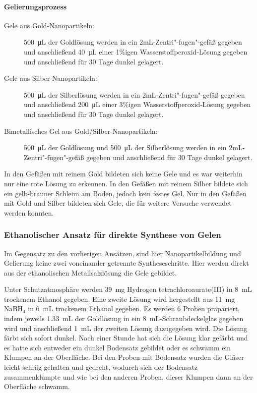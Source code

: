 			\paragraph{Gelierungsprozess}
			    \begin{description}
			    \item[Gele aus Gold-Nanopartikeln:]
			    \SI{500}{\micro\liter} der Goldlösung werden in ein 2mL-Zentri"-fugen"-gefäß gegeben und anschließend \SI{40}{\micro\liter} einer 1\%igen Wasserstoffperoxid-Lösung gegeben und anschließend für 30 Tage dunkel gelagert.
			    \item[Gele aus Silber-Nanopartikeln:]
			    \SI{500}{\micro\liter} der Silberlösung werden in ein 2mL-Zentri"-fugen"-gefäß gegeben und anschließend \SI{200}{\micro\liter} einer 3\%igen Wasserstoffperoxid-Lösung gegeben und anschließend für 30 Tage dunkel gelagert.
			    \item[Bimetallisches Gel aus Gold/Silber-Nanopartikeln:]
			    \SI{500}{\micro\liter} der Goldlösung und 	\SI{500}{\micro\liter} der Silberlösung werden in ein 2mL-Zentri"-fugen"-gefäß gegeben und anschließend für 30 Tage dunkel gelagert.
			    \end{description}
			   	
			   	In den Gefäßen mit reinem Gold bildeten sich keine Gele und es war weiterhin nur eine rote Lösung zu erkennen.
			   	In den Gefäßen mit reinem Silber bildete sich ein gelb-brauner Schleim am Boden, jedoch kein festes Gel.
			   	Nur in den Gefäßen mit Gold und Silber bildeten sich Gele, die für weitere Versuche verwendet werden konnten.
			
		\subsubsection{Ethanolischer Ansatz für direkte Synthese von Gelen}
			Im Gegensatz zu den vorherigen Ansätzen, sind hier Nanopartikelbildung und Gelierung keine zwei voneinander getrennte Syntheseschritte.
			Hier werden direkt aus der ethanolischen Metallsalzlösung die Gele gebildet. \autocite{Georgi2019}
			
			Unter Schutzatmosphäre werden \SI{39}{\milli\gram} Hydrogen tetrachloroaurate(III) in \SI{8}{\milli\liter} trockenem Ethanol gegeben.
			Eine zweite Lösung wird hergestellt aus \SI{11}{\milli\gram} NaBH$_4$ in \SI{6}{\milli\liter} trockenem Ethanol gegeben.
			Es werden 6 Proben präpariert, indem jeweils \SI{1,33}{\milli\liter} der Goldlösung in ein \SI{8}{\milli\liter}-Schraubdeckelglas gegeben wird und anschließend \SI{1}{\milli\liter} der zweiten Lösung dazugegeben wird.
			Die Lösung färbt sich sofort dunkel.
			Nach einer Stunde hat sich die Lösung klar gefärbt und es hatte sich entweder ein dunkel Bodensatz gebildet oder es schwamm ein Klumpen an der Oberfläche.
			Bei den Proben mit Bodensatz wurden die Gläser leicht schräg gehalten und gedreht, wodurch sich der Bodensatz zusammenklumpte und wie bei den anderen Proben, dieser Klumpen dann an der Oberfläche schwamm.  
			
